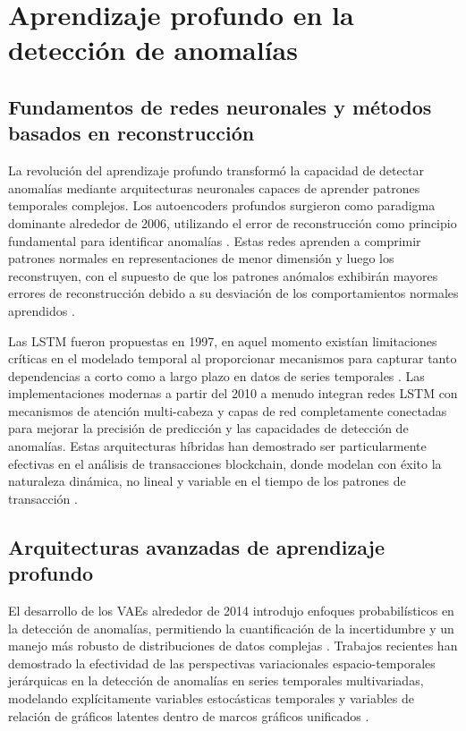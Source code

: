 \section{Aprendizaje profundo en la detección de anomalías}
\subsection{Fundamentos de redes neuronales y métodos basados en reconstrucción}

La revolución del aprendizaje profundo transformó la capacidad de detectar anomalías mediante arquitecturas neuronales capaces de aprender patrones temporales complejos. Los autoencoders profundos surgieron como paradigma dominante alrededor de 2006, utilizando el error de reconstrucción como principio fundamental para identificar anomalías . Estas redes aprenden a comprimir patrones normales en representaciones de menor dimensión y luego los reconstruyen, con el supuesto de que los patrones anómalos exhibirán mayores errores de reconstrucción debido a su desviación de los comportamientos normales aprendidos \cite{hinton_reducing_2006}.

Las LSTM fueron propuestas en 1997, en aquel momento existían limitaciones críticas en el modelado temporal al proporcionar mecanismos para capturar tanto dependencias a corto como a largo plazo en datos de series temporales \cite{hochreiter_long_1997}. Las implementaciones modernas a partir del 2010 a menudo integran redes LSTM con mecanismos de atención multi-cabeza y capas de red completamente conectadas para mejorar la precisión de predicción y las capacidades de detección de anomalías. Estas arquitecturas híbridas han demostrado ser particularmente efectivas en el análisis de transacciones blockchain, donde modelan con éxito la naturaleza dinámica, no lineal y variable en el tiempo de los patrones de transacción \cite{xia_novel_2024}.

\subsection{Arquitecturas avanzadas de aprendizaje profundo}

El desarrollo de los VAEs alrededor de 2014 introdujo enfoques probabilísticos en la detección de anomalías, permitiendo la cuantificación de la incertidumbre y un manejo más robusto de distribuciones de datos complejas \cite{kingma_auto-encoding_2022-1}. Trabajos recientes han demostrado la efectividad de las perspectivas variacionales espacio-temporales jerárquicas en la detección de anomalías en series temporales multivariadas, modelando explícitamente variables estocásticas temporales y variables de relación de gráficos latentes dentro de marcos gráficos unificados \cite{zhang_rethinking_2024,yang_h-vgrae_2020}.


